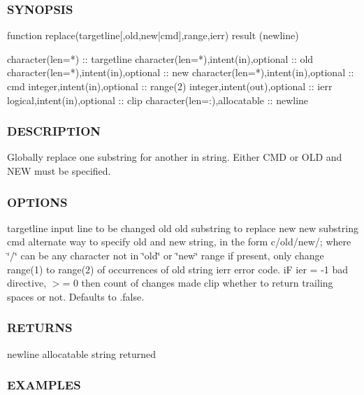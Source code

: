 \subsubsection*{S\+Y\+N\+O\+P\+S\+IS}

\begin{DoxyVerb}function replace(targetline[,old,new|cmd],range,ierr) result (newline)

 character(len=*)                       :: targetline
 character(len=*),intent(in),optional   :: old
 character(len=*),intent(in),optional   :: new
 character(len=*),intent(in),optional   :: cmd
 integer,intent(in),optional            :: range(2)
 integer,intent(out),optional           :: ierr
 logical,intent(in),optional            :: clip
 character(len=:),allocatable           :: newline
\end{DoxyVerb}
 \subsubsection*{D\+E\+S\+C\+R\+I\+P\+T\+I\+ON}

Globally replace one substring for another in string. Either C\+MD or O\+LD and N\+EW must be specified.

\subsubsection*{O\+P\+T\+I\+O\+NS}

targetline input line to be changed old old substring to replace new new substring cmd alternate way to specify old and new string, in the form c/old/new/; where \char`\"{}/\char`\"{} can be any character not in \char`\"{}old\char`\"{} or \char`\"{}new\char`\"{} range if present, only change range(1) to range(2) of occurrences of old string ierr error code. iF ier = -\/1 bad directive, $>$= 0 then count of changes made clip whether to return trailing spaces or not. Defaults to .false. \subsubsection*{R\+E\+T\+U\+R\+NS}

newline allocatable string returned

\subsubsection*{E\+X\+A\+M\+P\+L\+ES}

